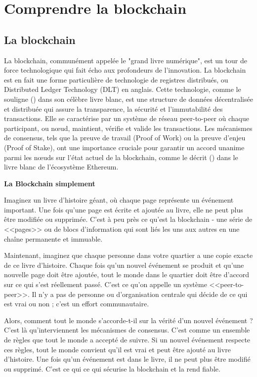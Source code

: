 \section{Comprendre la blockchain}\label{sec:concert_crypto}

\subsection{La blockchain} \label{subsec:blockchain}


La blockchain, communément appelée le "grand livre numérique", est un tour de force technologique qui fait écho aux profondeurs de l'innovation. La blockchain est en fait une forme particulière de technologie de registres distribués, ou Distributed Ledger Technology (DLT) en anglais. Cette technologie, comme le souligne \citeauthor{satoshi_nakamoto_bitcoin_2008} (\citeyear{satoshi_nakamoto_bitcoin_2008}) dans son célèbre livre blanc, est une structure de données décentralisée et distribuée qui assure la transparence, la sécurité et l'immutabilité des transactions. Elle se caractérise par un système de réseau peer-to-peer où chaque participant, ou nœud, maintient, vérifie et valide les transactions. Les mécanismes de consensus, tels que la preuve de travail (Proof of Work) ou la preuve d'enjeu (Proof of Stake), ont une importance cruciale pour garantir un accord unanime parmi les nœuds sur l'état actuel de la blockchain, comme le décrit \citeauthor{vitalik_buterin_next-generation_2014} (\citeyear{vitalik_buterin_next-generation_2014}) dans le livre blanc de l'écosystème Ethereum. 

\begin{tcolorbox}
\textbf{La Blockchain simplement}

Imaginez un livre d'histoire géant, où chaque page représente un événement important. Une fois qu'une page est écrite et ajoutée au livre, elle ne peut plus être modifiée ou supprimée. C'est à peu près ce qu'est la blockchain - une série de <<pages>> ou de blocs d'information qui sont liés les uns aux autres en une chaîne permanente et immuable.

Maintenant, imaginez que chaque personne dans votre quartier a une copie exacte de ce livre d'histoire. Chaque fois qu'un nouvel événement se produit et qu'une nouvelle page doit être ajoutée, tout le monde dans le quartier doit être d'accord sur ce qui s'est réellement passé. C'est ce qu'on appelle un système <<peer-to-peer>>. Il n'y a pas de personne ou d'organisation centrale qui décide de ce qui est vrai ou non ; c'est un effort communautaire.

Alors, comment tout le monde s'accorde-t-il sur la vérité d'un nouvel événement ? C'est là qu'interviennent les mécanismes de consensus. C'est comme un ensemble de règles que tout le monde a accepté de suivre. Si un nouvel événement respecte ces règles, tout le monde convient qu'il est vrai et peut être ajouté au livre d'histoire. Une fois qu'un événement est dans le livre, il ne peut plus être modifié ou supprimé. C'est ce qui ce qui sécurise la blockchain et la rend fiable.
\end{tcolorbox}

